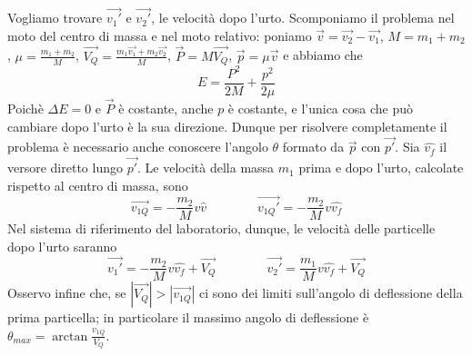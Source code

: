 \documentclass[../main.tex]{subfiles}
\begin{document}
Vogliamo trovare $\overrightarrow{{v_1}'}$ e $\overrightarrow{{v_2}'}$, le velocità dopo l'urto.
Scomponiamo il problema nel moto del centro di massa e nel moto relativo: poniamo $\overrightarrow v = \overrightarrow {v_2} - \overrightarrow {v_1}$,
$M = m_1+m_2$, $\mu = \frac{m_1+m_2}{M}$, $\overrightarrow {V_Q} = \frac{m_1\overrightarrow {v_1}+m_2\overrightarrow{v_2}}{M}$,
$\overrightarrow P = M\overrightarrow {V_Q}$, $\overrightarrow p = \mu \overrightarrow v$ e abbiamo che
\begin{equation}
 E = \frac{P^2}{2M} + \frac{p^2}{2\mu}
\end{equation}
Poichè $\Delta E = 0$ e $\overrightarrow P$ è costante, anche $p$ è costante, e l'unica cosa che può cambiare dopo l'urto è la sua direzione.
Dunque per risolvere completamente il problema è necessario anche conoscere l'angolo $\theta$ formato da $\overrightarrow p$ con $\overrightarrow {p'}$.
Sia $\hat{v_f}$ il versore diretto lungo $\overrightarrow {p'}$. Le velocità della massa $m_1$ prima e dopo l'urto, calcolate rispetto al centro di massa, sono
\begin{equation}
 \overrightarrow{v_{1Q}} = -\frac{m_2}{M}v\hat v \qquad \qquad
 \overrightarrow{{v_{1Q}}'} = -\frac{m_2}{M}v\hat{v_f}
\end{equation}
Nel sistema di riferimento del laboratorio, dunque, le velocità delle particelle dopo l'urto saranno
\begin{equation}\label{UrtiElastici}
 \overrightarrow {{v_1}'} = -\frac{m_2}{M}v\hat{v_f}+\overrightarrow {V_Q} \qquad \qquad
 \overrightarrow {{v_2}'} = \frac{m_1}{M}v\hat{v_f}+\overrightarrow {V_Q}
\end{equation}
Osservo infine che, se $|\overrightarrow {V_Q}| > |\overrightarrow{v_{1Q}}|$ ci sono dei limiti sull'angolo di deflessione della prima particella;
in particolare il massimo angolo di deflessione è $\theta_{max} = \arctan \frac{v_{1Q}}{V_Q}$.
\end{document}
